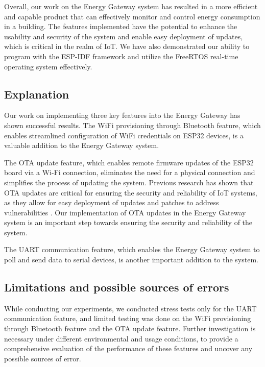 Overall, our work on the Energy Gateway system has resulted in a more efficient and capable product that can effectively monitor and control energy consumption in a building. The features implemented have the potential to enhance the usability and security of the system and enable easy deployment of updates, which is critical in the realm of IoT. We have also demonstrated our ability to program with the ESP-IDF framework and utilize the FreeRTOS real-time operating system effectively.

\subsection{Explanation}
\label{sec:explanation}

Our work on implementing three key features into the Energy Gateway has shown successful results. The WiFi provisioning through Bluetooth feature, which enables streamlined configuration of WiFi credentials on ESP32 devices, is a valuable addition to the Energy Gateway system.

The OTA update feature, which enables remote firmware updates of the ESP32 board via a Wi-Fi connection, eliminates the need for a physical connection and simplifies the process of updating the system. Previous research has shown that OTA updates are critical for ensuring the security and reliability of IoT systems, as they allow for easy deployment of updates and patches to address vulnerabilities \cite{Villegas:2019}. Our implementation of OTA updates in the Energy Gateway system is an important step towards ensuring the security and reliability of the system.

The UART communication feature, which enables the Energy Gateway system to poll and send data to serial devices, is another important addition to the system. 

\subsection{Limitations and possible sources of errors}
\label{sec:limitations}

While conducting our experiments, we conducted stress tests only for the UART communication feature, and limited testing was done on the WiFi provisioning through Bluetooth feature and the OTA update feature. Further investigation is necessary under different environmental and usage conditions, to provide a comprehensive evaluation of the performance of these features and uncover any possible sources of error.

